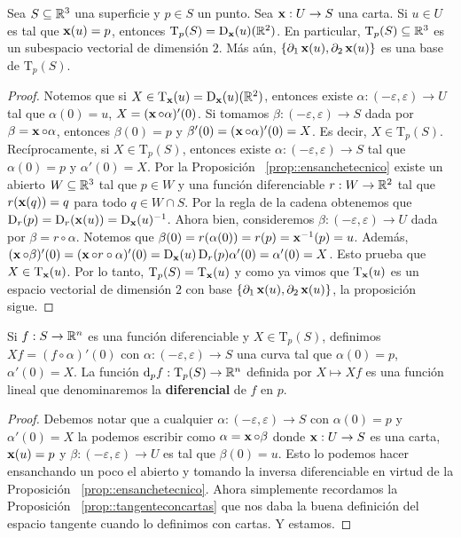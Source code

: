 \begin{prop}
Sea $S\subseteq\mathbb{R}^3$ una superficie y $p\in S$ un punto. Sea $\operatorname{\mathbf{x}}:U\to S$ una carta. Si $u\in U$ es tal que $\operatorname{\mathbf{x}}(u)=p$, entonces $\mathrm{T}_p(S) = \operatorname{\mathrm{D}}_{\operatorname{\mathbf{x}}}(u)(\mathbb{R}^2)$. En particular, $\mathrm{T}_p(S)\subseteq\mathbb{R}^3$ es un subespacio vectorial de dimensión $2$. Más aún, $\{\partial_1\operatorname{\mathbf{x}}(u),\partial_2\operatorname{\mathbf{x}}(u)\}$ es una base de $\mathrm{T}_p(S)$.
\begin{proof}
Notemos que si $X\in\mathrm{T}_{\operatorname{\mathbf{x}}}(u)=\operatorname{\mathrm{D}}_{\operatorname{\mathbf{x}}}(u)(\mathbb{R}^2)$, entonces existe $\alpha:(-\varepsilon,\varepsilon)\to U$ tal que $\alpha(0)=u$, $X=(\operatorname{\mathbf{x}}\circ\alpha)'(0)$. Si tomamos $\beta:(-\varepsilon,\varepsilon)\to S$ dada por $\beta = \operatorname{\mathbf{x}}\circ\alpha$, entonces $\beta(0)=p$ y $\beta'(0)=(\operatorname{\mathbf{x}}\circ\alpha)'(0)=X$. Es decir, $X\in\mathrm{T}_p(S)$. Recíprocamente, si $X\in\mathrm{T}_p(S)$, entonces existe $\alpha:(-\varepsilon,\varepsilon)\to S$ tal que $\alpha(0)=p$ y $\alpha'(0)=X$. Por la Proposición ~\ref{prop::ensanchetecnico} existe un abierto $W\subseteq\mathbb{R}^3$ tal que $p\in W$ y una función diferenciable $r:W\to \mathbb{R}^2$ tal que $r(\operatorname{\mathbf{x}}(q))=q$ para todo $q\in W\cap S$. Por la regla de la cadena obtenemos que $\operatorname{\mathrm{D}}_{r}(p)=\operatorname{\mathrm{D}}_{r}(\operatorname{\mathbf{x}}(u))=\operatorname{\mathrm{D}}_{\operatorname{\mathbf{x}}}(u)^{-1}$. Ahora bien, consideremos $\beta:(-\varepsilon,\varepsilon)\to U$ dada por $\beta=r\circ\alpha$. Notemos que $\beta(0)=r(\alpha(0))=r(p)=\operatorname{\mathbf{x}}^{-1}(p)=u$. Además, $(\operatorname{\mathbf{x}}\circ\beta)'(0)=(\operatorname{\mathbf{x}}\circ r\circ\alpha)'(0)=\operatorname{\mathrm{D}}_{\operatorname{\mathbf{x}}}(u)\operatorname{\mathrm{D}}_{r}(p)\alpha'(0)=\alpha'(0)=X$. Esto prueba que $X\in\mathrm{T}_{\operatorname{\mathbf{x}}}(u)$. Por lo tanto, $\mathrm{T}_p(S)=\mathrm{T}_{\operatorname{\mathbf{x}}}(u)$ y como ya vimos que $\mathrm{T}_{\operatorname{\mathbf{x}}}(u)$ es un espacio vectorial de dimensión $2$ con base $\{\partial_1\operatorname{\mathbf{x}}(u),\partial_2\operatorname{\mathbf{x}}(u)\}$, la proposición sigue.
\end{proof}
\end{prop}

\begin{prop}
Si $f:S\to\mathbb{R}^n$ es una función diferenciable y $X\in\mathrm{T}_p(S)$, definimos $Xf=(f\circ\alpha)'(0)$ con $\alpha:(-\varepsilon,\varepsilon)\to S$ una curva tal que $\alpha(0)=p$, $\alpha'(0)=X$. La función $\mathop{}\!\mathrm{d}_p f:\mathrm{T}_p(S)\to\mathbb{R}^n$ definida por $X\mapsto Xf$ es una función lineal que denominaremos la \textbf{diferencial} de $f$ en $p$.
\begin{proof}
Debemos notar que a cualquier $\alpha:(-\varepsilon,\varepsilon)\to S$ con $\alpha(0)=p$ y $\alpha'(0)=X$ la podemos escribir como $\alpha=\operatorname{\mathbf{x}}\circ\beta$ donde $\operatorname{\mathbf{x}}:U\to S$ es una carta, $\operatorname{\mathbf{x}}(u)=p$ y $\beta:(-\varepsilon,\varepsilon)\to U$ es tal que $\beta(0)=u$. Esto lo podemos hacer ensanchando un poco el abierto y tomando la inversa diferenciable en virtud de la Proposición ~\ref{prop::ensanchetecnico}. Ahora simplemente recordamos la Proposición ~\ref{prop::tangenteconcartas} que nos daba la buena definición del espacio tangente cuando lo definimos con cartas. Y estamos.
\end{proof}
\end{prop}

